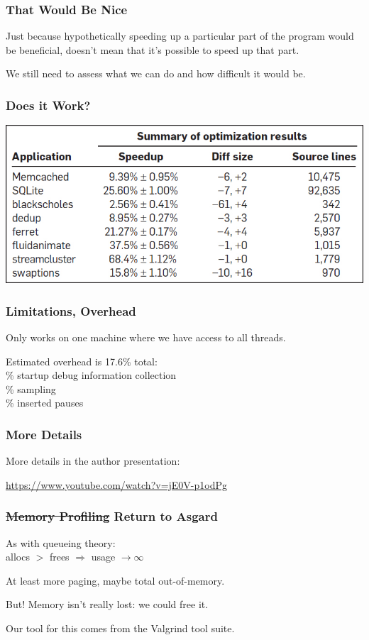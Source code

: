 \begin{frame}
\frametitle{That Would Be Nice}
Just because hypothetically speeding up a particular part of the program would be beneficial, doesn't mean that it's possible to speed up that part.

We still need to assess what we can do and how difficult it would be.

\end{frame}


\begin{frame}
\frametitle{Does it Work?}

\begin{center}
	\includegraphics[width=\textwidth]{images/coz-speedup.jpg}
\end{center}

\end{frame}


\begin{frame}
\frametitle{Limitations, Overhead}

Only works on one machine where we have access to all threads.

Estimated overhead is 17.6\% total:\\
\% startup debug information collection\\
\% sampling\\
\% inserted pauses

\end{frame}


\begin{frame}
\frametitle{More Details}

More details in the author presentation:

\url{https://www.youtube.com/watch?v=jE0V-p1odPg}

\end{frame}



\begin{frame}
\frametitle{\st{Memory Profiling} Return to Asgard}

\large

As with queueing theory:\\
\qquad allocs $>$ frees $\Longrightarrow$ usage $\rightarrow \infty$

At least more paging, maybe total out-of-memory.

But! Memory isn't really lost: we could free it.

Our tool for this comes from the Valgrind tool suite.


\end{frame}



